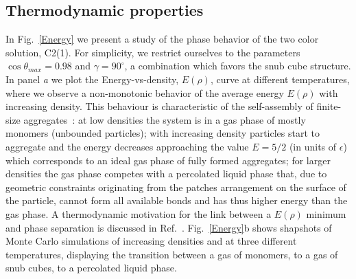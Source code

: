 \documentclass[a4paper, amsfonts, amssymb, amsmath, reprint, showkeys, nofootinbib, oneside]{revtex4-1}
\begin{document}
\subsection{Thermodynamic properties}


In Fig.~\ref{Energy} we present a study of the phase behavior of the two color solution, C2(1). For simplicity, we restrict ourselves to the parameters $\cos\theta_{max}=0.98$ and $\gamma=90^\circ$, a combination which favors the snub cube structure. In panel \emph{a} we plot the Energy-vs-density, $E(\rho)$, curve at different temperatures, where we observe a non-monotonic behavior of the average energy $E(\rho)$ with increasing density. This behaviour is characteristic of the self-assembly of finite-size aggregates~\cite{Sciortino2009}: at low densities the system is in a gas phase of mostly monomers (unbounded particles); with increasing density particles start to aggregate and the energy decreases approaching the value $E=5/2$ (in units of $\epsilon$) which corresponds to an ideal gas phase of fully formed aggregates; for larger densities the gas phase competes with a percolated liquid phase that, due to geometric constraints originating from the patches arrangement on the surface of the particle, cannot form all available bonds and has thus higher energy than the gas phase. A thermodynamic motivation for the link between a $E(\rho)$ minimum and phase separation is discussed in Ref.~\cite{Russo2021}. Fig.~\ref{Energy}b shows shapshots of Monte Carlo simulations of increasing densities and at three different temperatures, displaying the transition between a gas of monomers, to a gas of snub cubes, to a percolated liquid phase.



\end{document}

